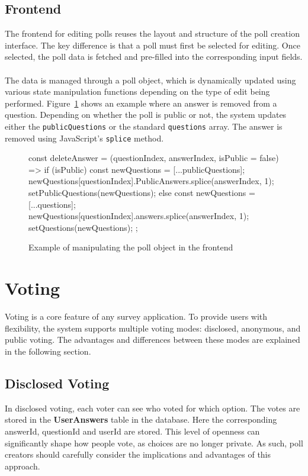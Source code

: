 \documentclass[a4paper,12pt]{report}
\begin{document}
\subsection{Frontend}
The frontend for editing polls reuses the layout and structure of the poll creation interface. The key difference is that a poll must first be selected for editing. Once selected, the poll data is fetched and pre-filled into the corresponding input fields. \\ \\
The data is managed through a poll object, which is dynamically updated using various state manipulation functions depending on the type of edit being performed. Figure~\ref{fig:editing} shows an example where an answer is removed from a question. Depending on whether the poll is public or not, the system updates either the \texttt{publicQuestions} or the standard \texttt{questions} array. The answer is removed using JavaScript’s \texttt{splice} method.

\begin{figure}[H]
	\begin{code}
		const deleteAnswer = (questionIndex, answerIndex, isPublic = false) => {
			if (isPublic) {
				const newQuestions = [...publicQuestions];
				newQuestions[questionIndex].PublicAnswers.splice(answerIndex, 1);
				setPublicQuestions(newQuestions);
			} else {
				const newQuestions = [...questions];
				newQuestions[questionIndex].answers.splice(answerIndex, 1);
				setQuestions(newQuestions);
			}
		};
	\end{code}
	\caption{Example of manipulating the poll object in the frontend}
	\label{fig:editing}
\end{figure}

\section{Voting}
Voting is a core feature of any survey application. To provide users with flexibility, the system supports multiple voting modes: disclosed, anonymous, and public voting. The advantages and differences between these modes are explained in the following section.
\subsection{Disclosed Voting}
In disclosed voting, each voter can see who voted for which option. The votes are stored in the \textbf{UserAnswers} table in the database. Here the corresponding answerId, questionId and userId are stored. This level of openness can significantly shape how people vote, as choices are no longer private. As such, poll creators should carefully consider the implications and advantages of this approach.
\end{document}

